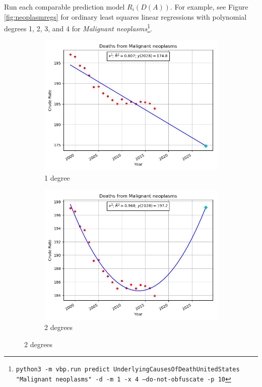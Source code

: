 \documentclass[12pt, a4paper, twocolumn]{article}
\begin{document}
Run each comparable prediction model $R_i(D(A))$. For example, see Figure \ref{fig:neoplasmregs} for ordinary least squares linear regressions with polynomial degrees 1, 2, 3, and 4 for \textit{Malignant neoplasms}\footnote{\texttt{python3 -m vbp.run predict UnderlyingCausesOfDeathUnitedStates "Malignant neoplasms" -d -m 1 -x 4 --do-not-obfuscate -p 10}}.

\begin{figure}
  \centering
  \begin{subfigure}[b]{0.4\textwidth}
    \includegraphics[width=\textwidth]{Malignant_neoplasms_1_model.png}
    \caption{1 degree}
    \label{fig:deg1}
  \end{subfigure}

  \begin{subfigure}[b]{0.4\textwidth}
    \includegraphics[width=\textwidth]{Malignant_neoplasms_2_model.png}
    \caption{2 degrees}
    \label{fig:deg2}
  \end{subfigure}


\end{figure}
\end{document}
